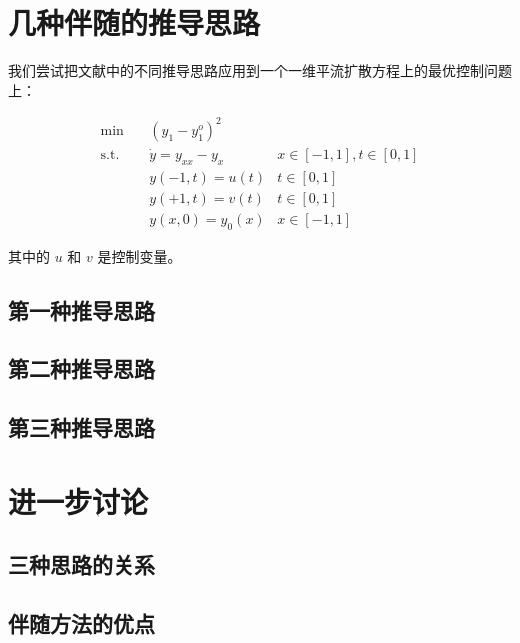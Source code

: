 \documentclass[a4paper,12pt]{article}
\begin{document}
\section{几种伴随的推导思路}

我们尝试把文献中的不同推导思路应用到一个一维平流扩散方程上的最优控制问题上：

$$
\begin{array}{rcll}
\min &~& (y_1 - y_1^o)^2 & \\
\mathrm{s.t.} &~& \dot{y} = y_{xx} - y_x & x \in [-1, 1], t \in [0, 1]\\
&~& y(-1, t) = u(t) & t \in [0, 1]\\
&~& y(+1, t) = v(t) & t \in [0, 1]\\
&~& y(x, 0) = y_0(x) & x \in [-1, 1]
\end{array}
$$

其中的 $ u $ 和 $ v $ 是控制变量。

\subsection{第一种推导思路}

\subsection{第二种推导思路}

\subsection{第三种推导思路}

\section{进一步讨论}

\subsection{三种思路的关系}

\subsection{伴随方法的优点}
\end{document}
